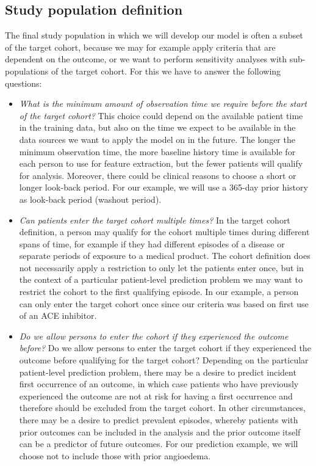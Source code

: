\documentclass[11pt]{book}
\theoremstyle{definition}
\theoremstyle{definition}
\theoremstyle{definition}
\theoremstyle{remark}
\begin{document}
\hypertarget{study-population-definition}{%
\subsection{Study population definition}\label{study-population-definition}}

The final study population in which we will develop our model is often a subset of the target cohort, because we may for example apply criteria that are dependent on the outcome, or we want to perform sensitivity analyses with sub-populations of the target cohort. For this we have to answer the following questions:

\begin{itemize}
\item
  \emph{What is the minimum amount of observation time we require before the start of the target cohort?} This choice could depend on the available patient time in the training data, but also on the time we expect to be available in the data sources we want to apply the model on in the future. The longer the minimum observation time, the more baseline history time is available for each person to use for feature extraction, but the fewer patients will qualify for analysis. Moreover, there could be clinical reasons to choose a short or longer look-back period. For our example, we will use a 365-day prior history as look-back period (washout period).
\item
  \emph{Can patients enter the target cohort multiple times?} In the target cohort definition, a person may qualify for the cohort multiple times during different spans of time, for example if they had different episodes of a disease or separate periods of exposure to a medical product. The cohort definition does not necessarily apply a restriction to only let the patients enter once, but in the context of a particular patient-level prediction problem we may want to restrict the cohort to the first qualifying episode. In our example, a person can only enter the target cohort once since our criteria was based on first use of an ACE inhibitor.
\item
  \emph{Do we allow persons to enter the cohort if they experienced the outcome before?} Do we allow persons to enter the target cohort if they experienced the outcome before qualifying for the target cohort? Depending on the particular patient-level prediction problem, there may be a desire to predict incident first occurrence of an outcome, in which case patients who have previously experienced the outcome are not at risk for having a first occurrence and therefore should be excluded from the target cohort. In other circumstances, there may be a desire to predict prevalent episodes, whereby patients with prior outcomes can be included in the analysis and the prior outcome itself can be a predictor of future outcomes. For our prediction example, we will choose not to include those with prior angioedema.

\end{itemize}
\end{document}
